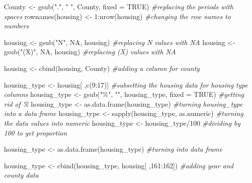\documentclass[
]{article}
\newenvironment{Shaded}{\begin{snugshade}}{\end{snugshade}}
\newcommand{\AttributeTok}[1]{\textcolor[rgb]{0.77,0.63,0.00}{#1}}
\newcommand{\CommentTok}[1]{\textcolor[rgb]{0.56,0.35,0.01}{\textit{#1}}}
\newcommand{\ConstantTok}[1]{\textcolor[rgb]{0.00,0.00,0.00}{#1}}
\newcommand{\DecValTok}[1]{\textcolor[rgb]{0.00,0.00,0.81}{#1}}
\newcommand{\FunctionTok}[1]{\textcolor[rgb]{0.00,0.00,0.00}{#1}}
\newcommand{\NormalTok}[1]{#1}
\newcommand{\OtherTok}[1]{\textcolor[rgb]{0.56,0.35,0.01}{#1}}
\newcommand{\SpecialCharTok}[1]{\textcolor[rgb]{0.00,0.00,0.00}{#1}}
\newcommand{\StringTok}[1]{\textcolor[rgb]{0.31,0.60,0.02}{#1}}
\begin{document}
\begin{Shaded}
\begin{Highlighting}[]
\NormalTok{County }\OtherTok{\textless{}{-}} \FunctionTok{gsub}\NormalTok{(}\StringTok{"."}\NormalTok{, }\StringTok{" "}\NormalTok{, County, }\AttributeTok{fixed =} \ConstantTok{TRUE}\NormalTok{) }\CommentTok{\#replacing the periods with spaces}
\FunctionTok{rownames}\NormalTok{(housing) }\OtherTok{\textless{}{-}} \DecValTok{1}\SpecialCharTok{:}\FunctionTok{nrow}\NormalTok{(housing) }\CommentTok{\#changing the row names to numbers}

\NormalTok{housing }\OtherTok{\textless{}{-}} \FunctionTok{gsub}\NormalTok{(}\StringTok{"N"}\NormalTok{, }\ConstantTok{NA}\NormalTok{, housing) }\CommentTok{\#replacing N values with NA}
\NormalTok{housing }\OtherTok{\textless{}{-}} \FunctionTok{gsub}\NormalTok{(}\StringTok{"(X)"}\NormalTok{, }\ConstantTok{NA}\NormalTok{, housing) }\CommentTok{\#replacing (X) values with NA}

\NormalTok{housing }\OtherTok{\textless{}{-}} \FunctionTok{cbind}\NormalTok{(housing, County) }\CommentTok{\#adding a column for county }
\end{Highlighting}
\end{Shaded}

\begin{Shaded}
\begin{Highlighting}[]
\NormalTok{housing\_type }\OtherTok{\textless{}{-}}\NormalTok{ housing[ ,}\FunctionTok{c}\NormalTok{(}\DecValTok{9}\SpecialCharTok{:}\DecValTok{17}\NormalTok{)] }\CommentTok{\#subsetting the housing data for housing type columns}
\NormalTok{housing\_type }\OtherTok{\textless{}{-}} \FunctionTok{gsub}\NormalTok{(}\StringTok{"\%"}\NormalTok{, }\StringTok{""}\NormalTok{, housing\_type, }\AttributeTok{fixed =} \ConstantTok{TRUE}\NormalTok{) }\CommentTok{\#getting rid of \% }
\NormalTok{housing\_type }\OtherTok{\textless{}{-}} \FunctionTok{as.data.frame}\NormalTok{(housing\_type) }\CommentTok{\#turning housing\_type into a data frame}
\NormalTok{housing\_type }\OtherTok{\textless{}{-}} \FunctionTok{sapply}\NormalTok{(housing\_type, as.numeric) }\CommentTok{\#turning the data values into numeric}
\NormalTok{housing\_type }\OtherTok{\textless{}{-}}\NormalTok{ housing\_type}\SpecialCharTok{/}\DecValTok{100} \CommentTok{\#dividing by 100 to get proportion}

\NormalTok{housing\_type }\OtherTok{\textless{}{-}} \FunctionTok{as.data.frame}\NormalTok{(housing\_type) }\CommentTok{\#turning into data frame}

\NormalTok{housing\_type }\OtherTok{\textless{}{-}} \FunctionTok{cbind}\NormalTok{(housing\_type, housing[ ,}\DecValTok{161}\SpecialCharTok{:}\DecValTok{162}\NormalTok{]) }\CommentTok{\#adding year and county data}
\end{Highlighting}
\end{Shaded}
\end{document}
